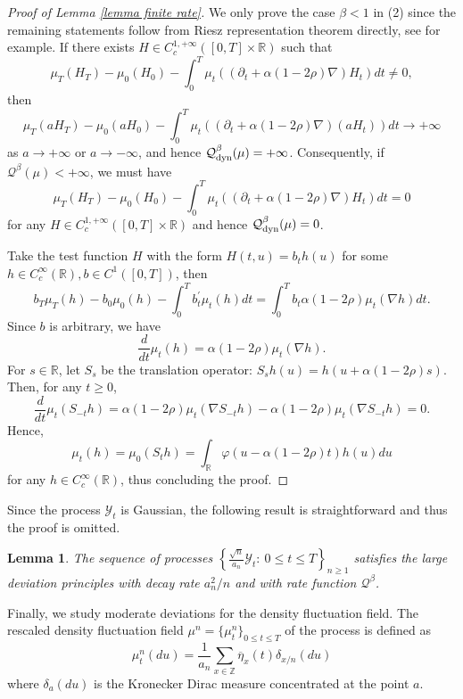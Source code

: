 \documentclass[reqno,11pt]{amsart}
\numberwithin{equation}{section}
\newtheorem{lemma}[theorem]{Lemma}
\newcommand{\R}{\mathbb{R}}
\begin{document}
\begin{proof}[Proof of Lemma \ref{lemma finite rate}]
We only prove the case $\beta<1$ in (2) since the remaining statements follow from  Riesz representation theorem directly, see \cite{gao2003moderate, kipnis1989hydrodynamics} for example. If there exists $H\in C_c^{1,+\infty}([0, T]\times \mathbb{R})$ such that
\[
\mu_T(H_T)-\mu_0(H_0)-\int_0^T\mu_t\left((\partial_t+\alpha(1-2\rho)\nabla)H_t\right)dt\neq 0,
\]
then
\[
\mu_T(aH_T)-\mu_0(aH_0)-\int_0^T\mu_t\left((\partial_t+\alpha(1-2\rho)\nabla)(aH_t)\right)dt\rightarrow+\infty
\]
as $a\rightarrow+\infty$ or $a\rightarrow -\infty$, and hence $\mathcal{Q}^\beta_{\rm dyn}(\mu)=+\infty$. Consequently, if $\mathcal{Q}^\beta(\mu)<+\infty$, we must have
\[
\mu_T(H_T)-\mu_0(H_0)-\int_0^T\mu_t\left((\partial_t+\alpha(1-2\rho)\nabla)H_t\right)dt=0
\]
for any $H\in C_c^{1,+\infty}([0, T]\times \mathbb{R})$ and hence $\mathcal{Q}_{\rm dyn}^\beta(\mu)=0$.

Take the test function $H$ with the form $H(t,u)=b_th(u)$ for some $h\in C_c^\infty(\R), b\in C^1 ([0, T])$, then
\[
b_T\mu_T(h)-b_0\mu_0(h)-\int_0^Tb^\prime_t\mu_t(h)dt=\int_0^Tb_t\alpha(1-2\rho)\mu_t(\nabla h)dt.
\]
Since $b$ is arbitrary, we have
\[
\frac{d}{dt}\mu_t(h)=\alpha(1-2\rho)\mu_t(\nabla h).
\]
For $s\in \R$, let $S_{s}$ be the translation operator:  $S_{s}h(u)=h(u+\alpha(1-2\rho)s)$.  Then, for any $t\geq 0$,
\[
\frac{d}{dt}\mu_t(S_{-t}h)=\alpha(1-2\rho)\mu_t(\nabla S_{-t}h)-\alpha(1-2\rho)\mu_t(\nabla S_{-t}h)=0.
\]
 Hence,
\[
\mu_t(h)=\mu_0 (S_th)=\int_{\R}\varphi(u-\alpha(1-2\rho)t)h(u)du
\]
for any $h\in C_c^\infty(\R)$, thus concluding the proof. 
\end{proof}



Since the process $\mathcal{Y}_t$ is Gaussian, the following result is straightforward and thus the proof is omitted.  

\begin{lemma}\label{lem MPD of the fluctuation limit}
The sequence of processes $\left\{\frac{\sqrt{n}}{a_n}\mathcal{Y}_t:~0\leq t\leq T\right\}_{n\geq 1}$ satisfies the large deviation principles with decay rate $a_n^2/n$ and with rate function $\mathcal{Q}^\beta$. 
\end{lemma}

Finally, we study moderate deviations for the  density fluctuation field. The rescaled density fluctuation field $\mu^n=\{\mu^n_t\}_{0\leq t\leq T}$ of the process is defined as  
\begin{equation}\label{equ intial rate funtion}
	\mu^n_t(du)=\frac{1}{a_n}\sum_{x\in \mathbb{Z}}\overline{\eta}_x(t)\delta_{x/n}(du)
\end{equation}
where $\delta_a(du)$ is the Kronecker Dirac measure concentrated at the point $a$.
\end{document}
